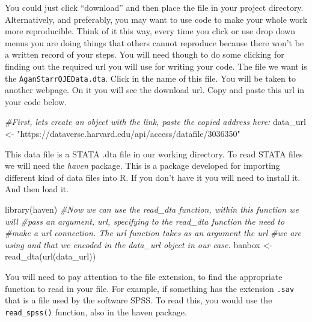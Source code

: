 \documentclass[
]{book}
\newenvironment{Shaded}{\begin{snugshade}}{\end{snugshade}}
\newcommand{\CommentTok}[1]{\textcolor[rgb]{0.56,0.35,0.01}{\textit{#1}}}
\newcommand{\FunctionTok}[1]{\textcolor[rgb]{0.00,0.00,0.00}{#1}}
\newcommand{\NormalTok}[1]{#1}
\newcommand{\OtherTok}[1]{\textcolor[rgb]{0.56,0.35,0.01}{#1}}
\newcommand{\StringTok}[1]{\textcolor[rgb]{0.31,0.60,0.02}{#1}}
\begin{document}
You could just click ``download'' and then place the file in your project directory. Alternatively, and preferably, you may want to use code to make your whole work more reproducible. Think of it this way, every time you click or use drop down menus you are doing things that others cannot reproduce because there won't be a written record of your steps. You will need though to do some clicking for finding out the required url you will use for writing your code. The file we want is the \texttt{AganStarrQJEData.dta}. Click in the name of this file. You will be taken to another webpage. On it you will see the download url. Copy and paste this url in your code below.

\begin{Shaded}
\begin{Highlighting}[]
\CommentTok{\#First, let\textquotesingle{}s create an object with the link, paste the copied address here:}
\NormalTok{data\_url }\OtherTok{\textless{}{-}} \StringTok{"https://dataverse.harvard.edu/api/access/datafile/3036350"}
\end{Highlighting}
\end{Shaded}

This data file is a STATA .dta file in our working directory. To read STATA files we will need the \emph{haven} package. This is a package developed for importing different kind of data files into R. If you don't have it you will need to install it. And then load it.

\begin{Shaded}
\begin{Highlighting}[]
\FunctionTok{library}\NormalTok{(haven)}
\CommentTok{\#Now we can use the read\_dta function, within this function we will}
\CommentTok{\#pass an argument, url, specifying to the read\_dta function the need to}
\CommentTok{\#make a url connection. The url function takes as an argument the url}
\CommentTok{\#we are using and that we encoded in the data\_url object in our case.}
\NormalTok{banbox }\OtherTok{\textless{}{-}} \FunctionTok{read\_dta}\NormalTok{(}\FunctionTok{url}\NormalTok{(data\_url))}
\end{Highlighting}
\end{Shaded}

You will need to pay attention to the file extension, to find the appropriate function to read in your file. For example, if something has the extension \texttt{.sav} that is a file used by the software SPSS. To read this, you would use the \texttt{read\_spss()} function, also in the haven package.
\end{document}
